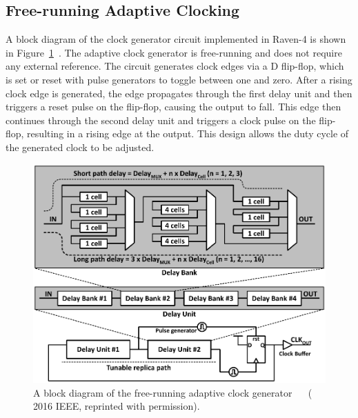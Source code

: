 \documentclass[graybox]{svmult}
\begin{document}
\subsection{Free-running Adaptive Clocking}

A block diagram of the clock generator circuit implemented in Raven-4 is shown in Figure~\ref{fig:3-clockgen}~\cite{Keller2017}.
The adaptive clock generator is free-running and does not require any external reference.
The circuit generates clock edges via a D flip-flop, which is set or reset with pulse generators to toggle between one and zero.
After a rising clock edge is generated, the edge propagates through the first delay unit and then triggers a reset pulse on the flip-flop, causing the output to fall.
This edge then continues through the second delay unit and triggers a clock pulse on the flip-flop, resulting in a rising edge at the output.
This design allows the duty cycle of the generated clock to be adjusted.

\begin{figure}
  \centering
  \includegraphics[width=\textwidth]{3-clockgen}
  \caption{A block diagram of the free-running adaptive clock generator~\cite{Keller2017} ~\cite{Keller2016} ({\textcopyright} 2016 IEEE, reprinted with permission).}
  \label{fig:3-clockgen}
\end{figure}
\end{document}
